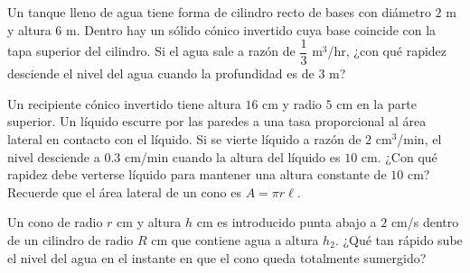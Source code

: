 \begin{prob}
Un tanque lleno de agua tiene forma de cilindro recto de bases con
diámetro $2$ m y altura $6$ m. Dentro hay un sólido cónico invertido
cuya base coincide con la tapa superior del cilindro. Si el agua sale
a razón de $\dfrac{1}{3}$ m$^3$/hr, ¿con qué rapidez desciende el
nivel del agua cuando la profundidad es de $3$ m?
\end{prob}

\begin{prob}
Un recipiente cónico invertido tiene altura $16$ cm y radio $5$ cm en
la parte superior. Un líquido escurre por las paredes a una tasa
proporcional al área lateral en contacto con el líquido. Si se vierte
líquido a razón de $2$ cm$^3$/min, el nivel desciende a $0.3$ cm/min
cuando la altura del líquido es $10$ cm. ¿Con qué rapidez debe
verterse líquido para mantener una altura constante de $10$ cm? Recuerde que el área lateral de un cono es \(A=\pi r\ell.\)
\end{prob}

\begin{prob}
Un cono de radio $r$ cm y altura $h$ cm es introducido punta abajo a
$2$ cm/s dentro de un cilindro de radio $R$ cm que contiene agua a
altura $h_2$. ¿Qué tan rápido sube el nivel del agua en el instante
en que el cono queda totalmente sumergido?
\end{prob}


